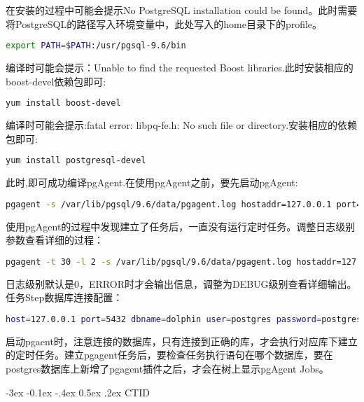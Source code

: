 \documentclass[8pt]{book}
\makeatletter
\numberwithin{dummy}{section}
\theoremstyle{ocrenumbox}
\theoremstyle{blacknumex}
\theoremstyle{blacknumbox}
\theoremstyle{ocrenum}
\renewcommand{\subsection}{\@startsection {subsection}{2}{\z@}
	{-3ex \@plus -0.1ex \@minus -.4ex}
	{0.5ex \@plus.2ex }
	{\normalfont\sffamily\bfseries}}
\makeatother
\begin{document}
在安装的过程中可能会提示No PostgreSQL installation could be found。此时需要将PostgreSQL的路径写入环境变量中，此处写入的home目录下的profile。

\begin{lstlisting}[language=Bash]
export PATH=$PATH:/usr/pgsql-9.6/bin
\end{lstlisting}

编译时可能会提示：Unable to find the requested Boost libraries.此时安装相应的boost-devel依赖包即可:

\begin{lstlisting}[language=Bash]
yum install boost-devel
\end{lstlisting}

编译时可能会提示:fatal error: libpq-fe.h: No such file or directory.安装相应的依赖包即可:

\begin{lstlisting}[language=Bash]
yum install postgresql-devel
\end{lstlisting}


此时,即可成功编译pgAgent.在使用pgAgent之前，要先启动pgAgent:

\begin{lstlisting}[language=Bash]
pgagent -s /var/lib/pgsql/9.6/data/pgagent.log hostaddr=127.0.0.1 port=5432 dbname=dolphin user=postgres password=postgres
\end{lstlisting}

使用pgAgent的过程中发现建立了任务后，一直没有运行定时任务。调整日志级别参数查看详细的过程：

\begin{lstlisting}[language=Bash]
pgagent -t 30 -l 2 -s /var/lib/pgsql/9.6/data/pgagent.log hostaddr=127.0.0.1 port=5432 dbname=postgres user=postgres password=postgres
\end{lstlisting}

日志级别默认是0，ERROR时才会输出信息，调整为DEBUG级别查看详细输出。任务Step数据库连接配置：

\begin{lstlisting}[language=Bash]
host=127.0.0.1 port=5432 dbname=dolphin user=postgres password=postgres connect_timeout=10
\end{lstlisting}

启动pgaent时，注意连接的数据库，只有连接到正确的库，才会执行对应库下建立的定时任务。建立pgagent任务后，要检查任务执行语句在哪个数据库，要在postgres数据库上新增了pgagent插件之后，才会在树上显示pgAgent Jobs。

\subsection{CTID}
\end{document}
